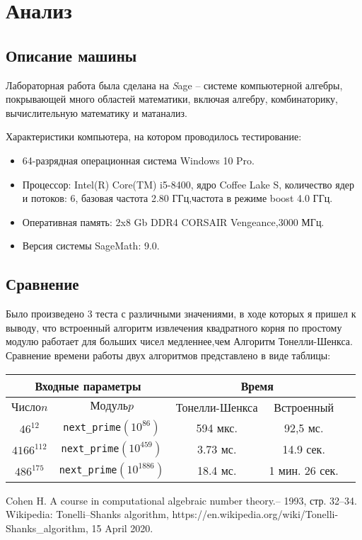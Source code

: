 \documentclass[11pt]{article}
\begin{document}
\newpage

\section{Анализ}
\subsection{Описание машины}

Лабораторная работа была сделана на {\textit Sage} -- системе компьютерной алгебры, покрывающей много областей математики, включая алгебру, комбинаторику, вычислительную математику и матанализ.

Характеристики компьютера, на котором проводилось тестирование:
\begin{itemize}
	\item 64-разрядная операционная система Windows 10 Pro.
	\item Процессор: Intel(R) Core(TM) i5-8400, ядро Coffee Lake S, 
	количество ядер и потоков: 6, базовая частота 2.80 ГГц,частота в режиме boost 4.0 ГГц.
	\item Оперативная память: 2x8 Gb DDR4 CORSAIR Vengeance,3000 МГц.
	\item Версия системы SageMath: 9.0.
\end{itemize}

\subsection{Сравнение}
Было произведено 3 теста с различными значениями, в ходе которых я пришел к выводу, что встроенный алгоритм извлечения квадратного корня по простому модулю работает для больших чисел медленнее,чем Алгоритм Тонелли-Шенкса. Сравнение времени работы двух алгоритмов представлено в виде таблицы: 
\\

\begin{center}
\begin{tabular}{|c|c|c|c|c|}
	\hline
	
	\multicolumn{2}{|c|}{Входные параметры} & \multicolumn{2}{|c|}{Время}\\
	\hline
	$Число n$ & $Модуль p$ & Тонелли-Шенкса & Встроенный\\[5pt] 
	\hline
	$46^{12}$ & \verb|next_prime|$(10^{86})$ & 594 мкс. & 92,5 мс.\\
	\hline
	$4166^{112}$ & \verb|next_prime|$(10^{459})$ & 3.73 мс. & 14.9 сек.\\
	\hline
    $486^{175}$ & \verb|next_prime|$(10^{1886})$ & 18.4 мс. & 1 мин. 26 сек.\\
	\hline	
\end{tabular}	
\end{center}
\begin{thebibliography}{1}	
	Cohen H. A course in computational algebraic number theory.-- 1993, стр. 32--34.
	Wikipedia: Tonelli–Shanks algorithm, https://en.wikipedia.org/wiki/Tonelli-Shanks\_algorithm, 15 April 2020.
\end{thebibliography}
\end{document}
